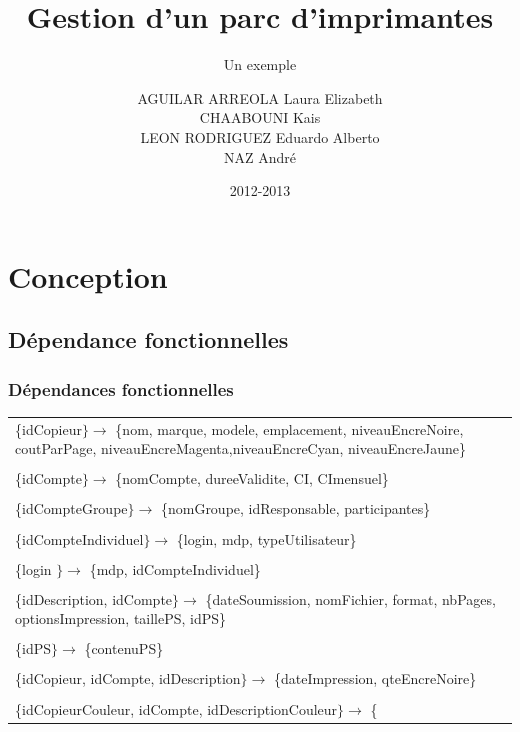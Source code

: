 \documentclass{beamer}
\title[Version courte du titre]{Gestion d'un parc d'imprimantes}
\subtitle{Un exemple} %
\author{       
                     AGUILAR ARREOLA Laura Elizabeth\\
                     CHAABOUNI Kais\\
                     LEON RODRIGUEZ Eduardo Alberto\\
                     NAZ André\\}
\institute{Ensimag}
\date{2012-2013}
\begin{document}
\begin{frame}
  \titlepage
\end{frame}

\section{Conception}

\subsection{Dépendance fonctionnelles}

\begin{frame} \frametitle{Dépendances fonctionnelles}

\tiny
          \begin{tabular}{p{10cm}}
            \{idCopieur$\} \rightarrow$  \{nom, marque, modele, emplacement,
            niveauEncreNoire, coutParPage, niveauEncreMagenta,niveauEncreCyan, niveauEncreJaune\}\\
            \\
            \{idCompte$\} \rightarrow$  \{nomCompte, dureeValidite, CI, CImensuel\}\\
            \\
            \{idCompteGroupe$\} \rightarrow$  \{nomGroupe, idResponsable, participantes\}\\
            \\
	    \{idCompteIndividuel$\} \rightarrow$  \{login, mdp, typeUtilisateur\}\\
	    \\
            \{login $\} \rightarrow$  \{mdp, idCompteIndividuel\}\\
            \\
            \{idDescription, idCompte$\} \rightarrow$  
            \{dateSoumission, nomFichier, format, nbPages, optionsImpression, taillePS, idPS\}\\
            \\
            \{idPS$\} \rightarrow$  \{contenuPS\}\\
            \\
            \{idCopieur, idCompte, idDescription$\} \rightarrow$  \{dateImpression, qteEncreNoire\}\\
            \\
            \{idCopieurCouleur, idCompte, idDescriptionCouleur$\} \rightarrow$  \{

\end{tabular}
\end{frame}
\end{document}
